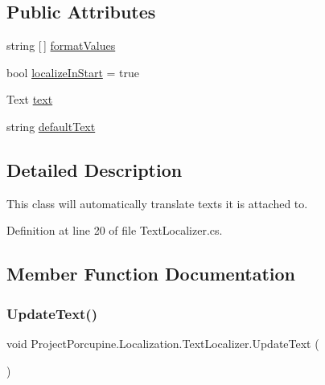 \subsection*{Public Attributes}
\begin{DoxyCompactItemize}
\item 
string \mbox{[}$\,$\mbox{]} \hyperlink{class_project_porcupine_1_1_localization_1_1_text_localizer_aeddc75ef9f9461cd60bcf5f44e93dc82}{format\+Values}
\item 
bool \hyperlink{class_project_porcupine_1_1_localization_1_1_text_localizer_a8305368f4318963600683bed47a9566a}{localize\+In\+Start} = true
\item 
Text \hyperlink{class_project_porcupine_1_1_localization_1_1_text_localizer_a02a01eb50d14beb17efb078bee18374c}{text}
\item 
string \hyperlink{class_project_porcupine_1_1_localization_1_1_text_localizer_a3efa9cab9be2045d92967ad827ceffe9}{default\+Text}
\end{DoxyCompactItemize}


\subsection{Detailed Description}
This class will automatically translate texts it is attached to. 

Definition at line 20 of file Text\+Localizer.\+cs.



\subsection{Member Function Documentation}
\mbox{\label{class_project_porcupine_1_1_localization_1_1_text_localizer_a2e8d0a2556047f360a020559b9e0e146}} 
\subsubsection{\texorpdfstring{Update\+Text()}{UpdateText()}\hspace{0.1cm}{\footnotesize\ttfamily [1/2]}}
{\footnotesize\ttfamily void Project\+Porcupine.\+Localization.\+Text\+Localizer.\+Update\+Text (\begin{DoxyParamCaption}{ }\end{DoxyParamCaption})}



